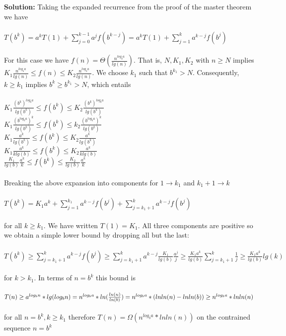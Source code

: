 \documentclass[11pt]{article}
\begin{document}
\begin{enumerate}
\textbf{Solution:} Taking the expanded recurrence from the proof of the master theorem we have\\\\$T(b^k)=a^kT(1)+\sum\limits_{j=0}^{k-1}a^jf(b^{k-j})=a^kT(1)+\sum\limits_{j=1}^ka^{k-j}f(b^j)$\\\\For this case we have $f(n)=\Theta(\frac{n^{log_ba}}{lg(n)})$. That is, $N,K_1,K_2$ with $n \geq N$ implies $K_1\frac{n^{log_ba}}{lg(n)} \leq f(n) \leq K_2\frac{n^{log_ba}}{lg(n)}$. We choose $k_1$ such that $b^{k_1} > N$. Consequently, $k \geq k_1$ implies $b^k \geq b^{k_1} > N$, which entails\\\\$K_1\frac{(b^k)^{log_ba}}{lg(b^k)} \leq f(b^k) \leq K_2\frac{(b^k)^{log_ba}}{lg(b^k)}$\\$K_1\frac{(b^{log_ba})^k}{lg(b^k)} \leq f(b^k) \leq k_2\frac{(b^{log_ba})^k}{lg(b^k)}$\\$K_1\frac{a^k}{lg(b^k)} \leq f(b^k) \leq K_2\frac{a^k}{lg(b^k)}$\\$K_1\frac{a^k}{klg(b)} \leq f(b^k) \leq K_2\frac{a^k}{klg(b)}$\\$\frac{K_1}{lg(b)}\frac{a^k}{k} \leq f(b^k) \leq \frac{K_2}{lg(b)}\frac{a^k}{k}$\\\\Breaking the above expansion into components for $1 \rightarrow k_1$ and $k_1+1 \rightarrow k$\\\\$T(b^k)=K_1a^k+\sum\limits_{j=1}^{k_1}a^{k-j}f(b^j)+\sum\limits_{j=k_1+1}^{k}a^{k-j}f(b^j)$\\\\for all $k \geq k_1$. We have written $T(1) = K_1$. All three components are positive so we obtain a simple lower bound by dropping all but the last:\\\\$T(b^k) \geq \sum\limits_{j=k_1+1}^{k}a^{k-j}f(b^j) \geq \sum\limits_{j=k_1+1}^{k}a^{k-j}\frac{K_1}{lg(b)}\frac{a^j}{j} \geq \frac{K_1a^k}{lg(b)}\sum\limits_{j=k_1+1}^{k}\frac{1}{j} \geq \frac{K_1a^k}{lg(b)}lg(k)$\\\\for $k > k_1$. In terms of $n = b^k$ this bound is\\\\$T(n)\geq a^{log_bn}*lg(log_bn) = n^{log_ba}*ln(\frac{ln(n)}{ln(b)}) = n^{log_ba}*(lnln(n) - lnln(b))\\ \geq n^{log_ba}*lnln(n)$\\\\for all $n = b^k, k \geq k_1$ therefore $T(n) = \Omega(n^{log_ba}*lnln(n))$ on the contrained sequence $n = b^k$\\\\%

\end{enumerate}
\end{document}
